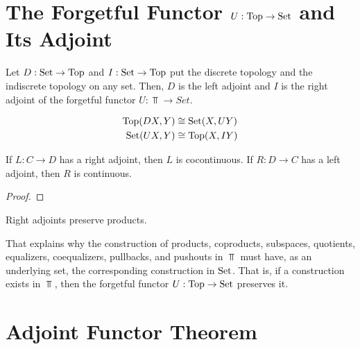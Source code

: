\documentclass{article}
\begin{document}
\section{The Forgetful Functor $U: \operatorname{Top} \to \operatorname{Set}$ and Its Adjoint}

\begin{example}

Let $D: \operatorname{Set} \to \operatorname{Top}$ and $I: \operatorname{Set} \to \operatorname{Top}$ put the discrete topology and the indiscrete topology on any set. Then, $D$ is the left adjoint and $I$ is the right adjoint of the forgetful functor $U: \Top \to Set$.

\begin{align*}
    \operatorname{Top}(DX, Y) &\cong \operatorname{Set}(X, UY) \\
    \operatorname{Set}(UX, Y) &\cong \operatorname{Top}(X, IY)
\end{align*}
    
\end{example}

\begin{theorem}
    If $L: C \to D$ has a right adjoint, then $L$ is cocontinuous. If $R: D \to C$ has a left adjoint, then $R$ is continuous.
\end{theorem}

\begin{proof}
\end{proof}

\begin{corollary}
    Right adjoints preserve products.
\end{corollary}

\begin{remark}
    That explains why the construction of products, coproducts, subspaces, quotients, equalizers, coequalizers, pullbacks, and pushouts in $\Top$ must have, as an underlying set, the corresponding construction in $\operatorname{Set}$. That is, if a construction exists in $\Top$, then the forgetful functor $U: \operatorname{Top} \to \operatorname{Set}$ preserves it.
\end{remark}

\section{Adjoint Functor Theorem}
\end{document}
